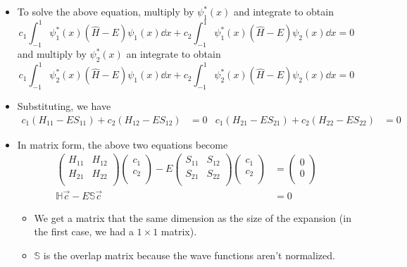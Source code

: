 \documentclass[../notes.tex]{subfiles}
\begin{document}
\begin{itemize}
\begin{itemize}
        \item To solve the above equation, multiply by $\psi_1^*(x)$ and integrate to obtain
        \begin{equation*}
            c_1\int_{-1}^1\psi_1^*(x)(\hat{H}-E)\psi_1(x)\dd{x}+c_2\int_{-1}^1\psi_1^*(x)(\hat{H}-E)\psi_2(x)\dd{x} = 0
        \end{equation*}
        and multiply by $\psi_2^*(x)$ an integrate to obtain
        \begin{equation*}
            c_1\int_{-1}^1\psi_2^*(x)(\hat{H}-E)\psi_1(x)\dd{x}+c_2\int_{-1}^1\psi_2^*(x)(\hat{H}-E)\psi_2(x)\dd{x} = 0
        \end{equation*}
        \item Substituting, we have
        \begin{align*}
            c_1(H_{11}-ES_{11})+c_2(H_{12}-ES_{12}) &= 0&
            c_1(H_{21}-ES_{21})+c_2(H_{22}-ES_{22}) &= 0
        \end{align*}
        \item In matrix form, the above two equations become
        \begin{align*}
            \begin{pmatrix}
                H_{11} & H_{12}\\
                H_{21} & H_{22}\\
            \end{pmatrix}
            \begin{pmatrix}
                c_1\\
                c_2\\
            \end{pmatrix}
            -E
            \begin{pmatrix}
                S_{11} & S_{12}\\
                S_{21} & S_{22}\\
            \end{pmatrix}
            \begin{pmatrix}
                c_1\\
                c_2\\
            \end{pmatrix}
            &=
            \begin{pmatrix}
                0\\
                0\\
            \end{pmatrix}\\
            \mathbb{H}\vec{c}-E\mathbb{S}\vec{c} &= 0
        \end{align*}
        \begin{itemize}
            \item We get a matrix that the same dimension as the size of the expansion (in the first case, we had a $1\times 1$ matrix).
            \item $\mathbb{S}$ is the overlap matrix because the wave functions aren't normalized.
        \end{itemize}
    \end{itemize}
\end{itemize}
\end{document}
